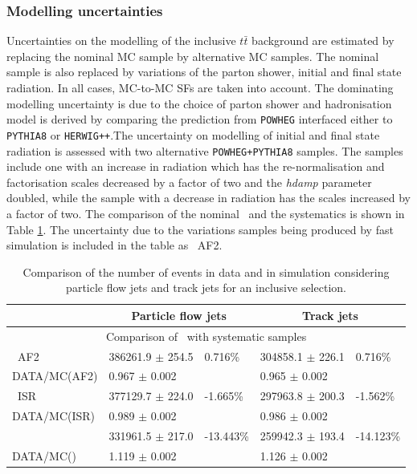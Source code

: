 \documentclass[letterpaper,12pt]{article}
\begin{document}
\subsubsection{Modelling uncertainties} Uncertainties on the modelling of the inclusive $t\bar{t}$ 
background are estimated by replacing the nominal MC sample by alternative MC samples. The nominal 
sample is also replaced by variations of the parton shower, initial 
and final state radiation. In all cases, MC-to-MC SFs are taken into account. The dominating modelling
uncertainty is due to the choice of parton shower and hadronisation model is derived by comparing the prediction 
from {\tt POWHEG} interfaced either to {\tt PYTHIA8} or {\tt HERWIG++}.The uncertainty on 
modelling of initial and final state radiation is assessed with two alternative {\tt POWHEG+PYTHIA8} 
samples. The samples include one with an increase in radiation which has the re-normalisation and 
factorisation scales decreased by a factor of two and the \textit{hdamp} parameter doubled, while 
the sample with a decrease in radiation has the scales increased by a factor of two. The comparison of 
the nominal \ttbar\ and the systematics is shown in Table \ref{tab:modelling_syst}. 
The uncertainty due to the variations samples being produced by fast simulation is included in the table as 
\ttbar\ AF2. 

\begin{table}[!b]
	\centering
	\small
	\setlength\tabcolsep{5pt} 
	\begin{tabular}{|l | ll | ll |}
	\hline
	& \multicolumn{2}{c|}{Particle flow jets} & \multicolumn{2}{c|}{Track jets} \\
	\hline
	\multicolumn{5}{|c|}{Comparison of \ttbar\ with systematic samples}\\
	\hline
	\ttbar\ AF2       &   386261.9 $\pm$ 254.5  &  0.716\% & 304858.1 $\pm$ 226.1 &  0.716\%\\
	DATA/MC(AF2)   &   0.967 $\pm$ 0.002     &      & 0.965 $\pm$ 0.002 &      \\              
	\ttbar\ ISR     &   377129.7 $\pm$   224.0  & -1.665\% &  297963.8 $\pm$   200.3  & -1.562\%\\     
	DATA/MC(ISR) & 0.989 $\pm$ 0.002         &      & 0.986 $\pm$ 0.002   &  \\       
	\ttbar\ \PYTHIA        &   331961.5 $\pm$   217.0  & -13.443\%&  259942.3 $\pm$      193.4  & -14.123\%\\ 
	DATA/MC(\PYTHIA)    & 1.119 $\pm$ 0.002         &       & 1.126 $\pm$ 0.002     &\\                
	\hline
	\end{tabular}
	\vspace{0.2cm}
	\caption{Comparison of the  number of events in data and in 
	simulation considering particle flow jets and track jets for an inclusive
	selection.}
	\label{tab:modelling_syst}
	\end{table}
\end{document}

